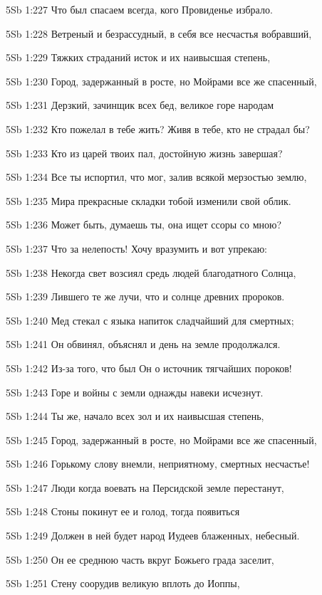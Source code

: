 \vs 5Sb 1:227 Что был спасаем всегда, кого Провиденье избрало.

\vs 5Sb 1:228 Ветреный и безрассудный, в себя все несчастья вобравший, 

\vs 5Sb 1:229 Тяжких страданий исток и их наивысшая степень,

\vs 5Sb 1:230 Город, задержанный в росте, но Мойрами все же спасенный, 

\vs 5Sb 1:231 Дерзкий, зачинщик всех бед, великое горе народам  

\vs 5Sb 1:232 Кто пожелал в тебе жить? Живя в тебе, кто не страдал бы? 

\vs 5Sb 1:233 Кто из царей твоих пал, достойную жизнь завершая? 

\vs 5Sb 1:234 Все ты испортил, что мог, залив всякой мерзостью землю, 

\vs 5Sb 1:235 Мира прекрасные складки тобой изменили свой облик. 

\vs 5Sb 1:236 Может быть,  думаешь ты,  она ищет ссоры со мною? 

\vs 5Sb 1:237 Что за нелепость! Хочу вразумить и вот  упрекаю: 

\vs 5Sb 1:238 Некогда свет возсиял средь людей благодатного Солнца, 

\vs 5Sb 1:239 Лившего те же лучи, что и солнце древних пророков. 

\vs 5Sb 1:240 Мед стекал с языка  напиток сладчайший для смертных; 

\vs 5Sb 1:241 Он обвинял, объяснял  и день на земле продолжался. 

\vs 5Sb 1:242 Из-за того, что был Он  о источник тягчайших пороков!  

\vs 5Sb 1:243 Горе и войны с земли однажды навеки исчезнут. 

\vs 5Sb 1:244 Ты же, начало всех зол и их наивысшая степень, 

\vs 5Sb 1:245 Город, задержанный в росте, но Мойрами все же спасенный, 

\vs 5Sb 1:246 Горькому слову внемли, неприятному, смертных несчастье!

\vs 5Sb 1:247 Люди когда воевать на Персидской земле перестанут,

\vs 5Sb 1:248 Стоны покинут ее и голод, тогда появиться

\vs 5Sb 1:249 Должен в ней будет народ Иудеев блаженных, небесный.

\vs 5Sb 1:250 Он ее среднюю часть вкруг Божьего града заселит, 

\vs 5Sb 1:251 Стену соорудив великую вплоть до Иоппы, 

